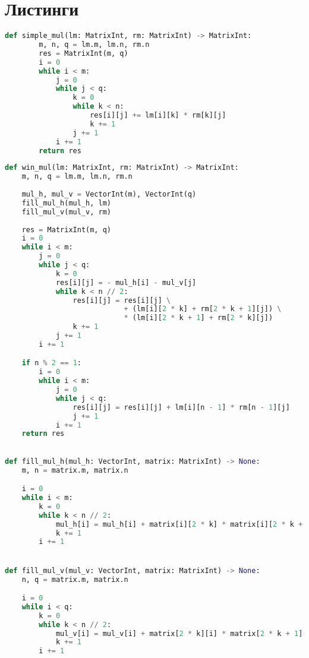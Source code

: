 \appendix
\chapter{Листинги}

\begin{lstlisting}[style=mypython,label=lst:classic,caption={Функция классического перемножения матриц},language=python]
    def simple_mul(lm: MatrixInt, rm: MatrixInt) -> MatrixInt:
        m, n, q = lm.m, lm.n, rm.n
        res = MatrixInt(m, q)
        i = 0
        while i < m:
            j = 0
            while j < q:
                k = 0
                while k < n:
                    res[i][j] += lm[i][k] * rm[k][j]
                    k += 1
                j += 1
            i += 1
        return res
    \end{lstlisting}
    
\begin{lstlisting}[style=mypython, escapeinside=``, label=lst:win,caption={Функция для перемножения матриц алгоритмом Винограда},language=python]
def win_mul(lm: MatrixInt, rm: MatrixInt) -> MatrixInt:
    m, n, q = lm.m, lm.n, rm.n
    
    mul_h, mul_v = VectorInt(m), VectorInt(q)
    fill_mul_h(mul_h, lm)
    fill_mul_v(mul_v, rm)
    
    res = MatrixInt(m, q)
    i = 0
    while i < m:
        j = 0
        while j < q:
            k = 0
            res[i][j] = - mul_h[i] - mul_v[j]
            while k < n // 2:
                res[i][j] = res[i][j] \
                            + (lm[i][2 * k] + rm[2 * k + 1][j]) \
                            * (lm[i][2 * k + 1] + rm[2 * k][j])
                k += 1
            j += 1
        i += 1

    if n % 2 == 1:
        i = 0
        while i < m:
            j = 0
            while j < q:
                res[i][j] = res[i][j] + lm[i][n - 1] * rm[n - 1][j]
                j += 1
            i += 1
    return res

    
def fill_mul_h(mul_h: VectorInt, matrix: MatrixInt) -> None:
    m, n = matrix.m, matrix.n

    i = 0
    while i < m:
        k = 0
        while k < n // 2:
            mul_h[i] = mul_h[i] + matrix[i][2 * k] * matrix[i][2 * k + 1]
            k += 1
        i += 1


def fill_mul_v(mul_v: VectorInt, matrix: MatrixInt) -> None:
    n, q = matrix.m, matrix.n

    i = 0
    while i < q:
        k = 0
        while k < n // 2:
            mul_v[i] = mul_v[i] + matrix[2 * k][i] * matrix[2 * k + 1][i]
            k += 1
        i += 1
\end{lstlisting}

